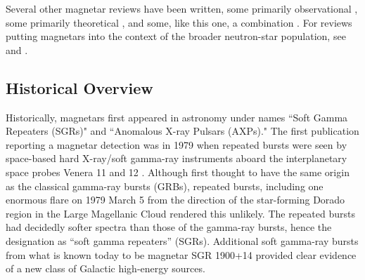\documentclass[letterpaper]{ar-1col}
\begin{document}
Several other magnetar reviews have been written, some primarily
observational \citep{re11}, some primarily theoretical \citep{tzw15}, and some, like this one,
a combination \citep{wt06, mpm15}.  For reviews putting magnetars into the context of the broader neutron-star
population, see \citet{kas10} and \citet{kk15}.


\subsection{Historical Overview}
\label{sec:history}

Historically, magnetars first appeared in astronomy under names ``Soft Gamma Repeaters (SGRs)" and 
``Anomalous X-ray Pulsars (AXPs)."
The first publication reporting a magnetar detection
was in 1979 when repeated bursts were seen by space-based hard
X-ray/soft gamma-ray instruments aboard the interplanetary space probes
Venera 11 and 12 \citep{mgg79,mgi+79,mg81}.
Although first thought to have the same origin as the classical gamma-ray
bursts (GRBs), repeated bursts, including one enormous flare on 1979
March 5 from the direction of the star-forming Dorado region in the
Large Magellanic Cloud \citep[LMC][]{mgi+79} rendered this unlikely.
The repeated bursts had decidedly softer spectra than those of
the gamma-ray bursts, hence the designation as ``soft gamma repeaters''
(SGRs).  Additional soft gamma-ray bursts from what is known today
to be magnetar SGR 1900+14 \citep{mgg79,mg81} 
provided clear evidence of a new class of Galactic high-energy sources. 
\end{document}
